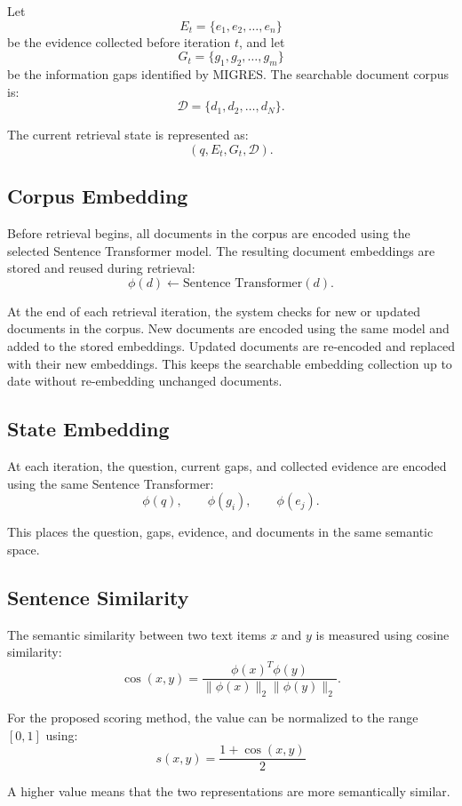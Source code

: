 \documentclass[12pt,a4paper]{report}
\begin{document}
Let
\[
E_t=\{e_1,e_2,\ldots,e_n\}
\]
be the evidence collected before iteration $t$, and let
\[
G_t=\{g_1,g_2,\ldots,g_m\}
\]
be the information gaps identified by MIGRES. The searchable document corpus is:
\[
\mathcal{D}=\{d_1,d_2,\ldots,d_N\}.
\]

The current retrieval state is represented as:
\[
\boxed{(q,E_t,G_t,\mathcal{D})}.
\]

\subsection{Corpus Embedding}

Before retrieval begins, all documents in the corpus are encoded using the selected Sentence Transformer model. The resulting document embeddings are stored and reused during retrieval:
\[
\phi(d) \leftarrow \text{Sentence Transformer}(d).
\]

At the end of each retrieval iteration, the system checks for new or updated documents in the corpus. New documents are encoded using the same model and added to the stored embeddings. Updated documents are re-encoded and replaced with their new embeddings. This keeps the searchable embedding collection up to date without re-embedding unchanged documents.

\subsection{State Embedding}

At each iteration, the question, current gaps, and collected evidence are encoded using the same Sentence Transformer:
\[
\phi(q),\qquad \phi(g_i),\qquad \phi(e_j).
\]

This places the question, gaps, evidence, and documents in the same semantic space.

\subsection{Sentence Similarity}

The semantic similarity between two text items $x$ and $y$ is measured using cosine similarity:
\[
\operatorname{cos}(x,y)=
\frac{\phi(x)^T\phi(y)}{\|\phi(x)\|_2\|\phi(y)\|_2}.
\]

For the proposed scoring method, the value can be normalized to the range $[0,1]$ using:
\[
\boxed{
 s(x,y)=\frac{1+\operatorname{cos}(x,y)}{2}
}
\tag{1}
\]

A higher value means that the two representations are more semantically similar.
\end{document}

